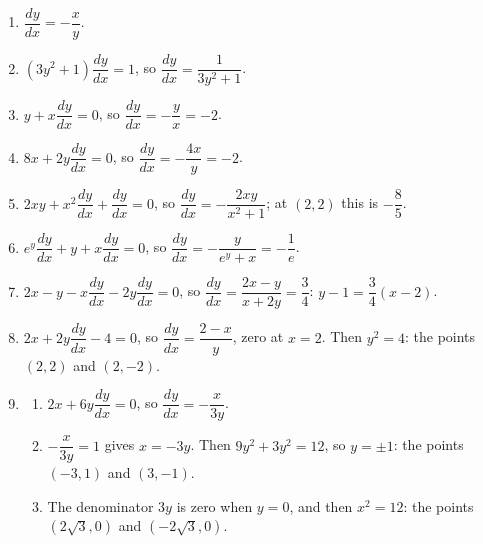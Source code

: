 \documentclass[11pt]{article}
\begin{document}
\newpage
\begin{solbox}
\begin{enumerate}[leftmargin=*,itemsep=4pt]
  \item $\dfrac{dy}{dx}=-\dfrac xy$.
  \item $\left(3y^2+1\right)\dfrac{dy}{dx}=1$, so $\dfrac{dy}{dx}=\dfrac{1}{3y^2+1}$.
  \item $y+x\dfrac{dy}{dx}=0$, so $\dfrac{dy}{dx}=-\dfrac yx=-2$.
  \item $8x+2y\dfrac{dy}{dx}=0$, so $\dfrac{dy}{dx}=-\dfrac{4x}{y}=-2$.
  \item $2xy+x^2\dfrac{dy}{dx}+\dfrac{dy}{dx}=0$, so $\dfrac{dy}{dx}=-\dfrac{2xy}{x^2+1}$; at $(2,2)$ this is $-\dfrac85$.
  \item $e^{y}\dfrac{dy}{dx}+y+x\dfrac{dy}{dx}=0$, so $\dfrac{dy}{dx}=-\dfrac{y}{e^{y}+x}=-\dfrac1e$.
  \item $2x-y-x\dfrac{dy}{dx}-2y\dfrac{dy}{dx}=0$, so $\dfrac{dy}{dx}=\dfrac{2x-y}{x+2y}=\dfrac34$: $y-1=\dfrac34(x-2)$.
  \item $2x+2y\dfrac{dy}{dx}-4=0$, so $\dfrac{dy}{dx}=\dfrac{2-x}{y}$, zero at $x=2$. Then $y^2=4$: the points $(2,2)$ and $(2,-2)$.
  \item \begin{enumerate}[label=(\alph*),leftmargin=*,itemsep=3pt]
    \item $2x+6y\dfrac{dy}{dx}=0$, so $\dfrac{dy}{dx}=-\dfrac{x}{3y}$.
    \item $-\dfrac{x}{3y}=1$ gives $x=-3y$. Then $9y^2+3y^2=12$, so $y=\pm1$: the points $(-3,1)$ and $(3,-1)$.
    \item The denominator $3y$ is zero when $y=0$, and then $x^2=12$: the points $\left(2\sqrt3,0\right)$ and $\left(-2\sqrt3,0\right)$.
  \end{enumerate}
\end{enumerate}
\end{solbox}
\end{document}
